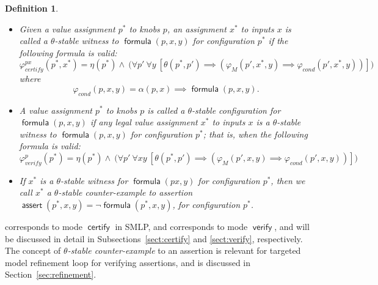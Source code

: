 \documentclass[a4paper,parskip=half]{article} %
\newcommand*\eqdef=
\newcommand*\query{\operatorname{\mathsf{query}}}
\newcommand*\assert{\operatorname{\mathsf{assert}}}
\newcommand*\formula{\operatorname{\mathsf{formula}}}
\newcommand*\mode[1]{\operatorname{\mathsf{#1}}} %
\newtheorem{defn}[thm]{Definition}
\newcommand{\delete}[1]{}
\begin{document}
\begin{defn}\label{def:stable:witness:validity}
\begin{itemize}
\item 
Given a value assignment $p^*$ to knobs $p$, an assignment $x^*$ to inputs $x$ is called a \emph{$\theta$-stable witness} 
to $\formula(p,x,y)$ for configuration $p^*$ if the following formula is valid:
\begin{equation}\label{form:gear:certify}
\varphi_{\mathit{certify}}^{px}(p^*,x^*) \eqdef
     \eta(p^*) \wedge ~\big(
    \forall p'~
    \forall y~[
   \theta(p^*, p') \implies (\varphi_M(p',x^*,y)  \implies  \varphi_{\mathit{cond}}(p',x^*,y))
    ]\big)
\end{equation}
where \[\varphi_{\mathit{cond}}(p,x,y) \eqdef \alpha(p,x) \implies \formula(p,x,y).\]
\item 
A value assignment $p^*$ to knobs $p$ is called a  \emph{$\theta$-stable configuration for $\formula(p,x,y)$} if any legal value assignment 
$x^*$ to inputs $x$ is a $\theta$-stable witness to $\formula(p,x,y)$ for configuration $p^*$; that is, when the following formula is valid:
\begin{equation}\label{form:gear:verify}
\varphi_{\mathit{verify}}^{p}(p^*) \eqdef
     \eta(p^*) \wedge ~\big(
    \forall p'~
    \forall xy~[
   \theta(p^*, p') \implies (\varphi_M(p',x,y)  \implies  \varphi_{\mathit{cond}}(p',x,y))
    ]\big)
\end{equation}
\item 
If $x^*$ is a  $\theta$-stable witness for $\formula(p x,y)$ for configuration $p^*$, then we call $x^*$  a \emph{$\theta$-stable counter-example to  
assertion $\assert(p^*, x,y)  \eqdef \neg \formula(p^*, x,y)$, for configuration $p^*$}.
\delete{
An assertion $\assert(p, x,y)$ is called \emph{$\theta$-valid with respect to knob configuration $p^*$} if its negation 
$\query(p, x,y) \eqdef \neg \assert(p, x,y)$ does not have a $\theta$-stable witness $x^*$ for $p^*$.  In the latter case  
assertion $\assert(p^*, x,y)$ is called \emph{$\theta$-valid}. Otherwise, if $x^*$ is a  $\theta$-stable witness for 
$\query(p^*, x,y)$, then we call $x^*$  a \emph{$\theta$-stable counter-example to  $\assert(p^*, x,y)$}, and 
$\assert(p^*, x,y)$ is \emph{$\theta$-falsifiable} (that is, it is not $\theta$-valid).
}
\end{itemize}
\end{defn}

 corresponds to mode $\mode{certify}$ in SMLP, and   
corresponds to mode $\mode{verify}$, and will be discussed in detail in Subsections~\ref{sect:certify} and \ref{sect:verify}, 
respectively. The concept of \emph{$\theta$-stable counter-example} to  an assertion is relevant for targeted model refinement
loop for verifying assertions, and is discussed in Section~\ref{sec:refinement}.
\end{document}
